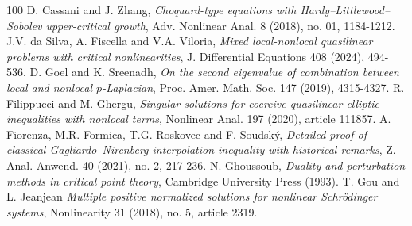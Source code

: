 \documentclass[11pt]{article}
\numberwithin{equation}{section}
\numberwithin{mytheorem}{section}
\begin{document}
\begin{thebibliography}{100}
					 D. Cassani and J. Zhang, {\it Choquard-type equations with Hardy–Littlewood–Sobolev upper-critical growth}, Adv. Nonlinear Anal. 8 (2018), no. 01, 1184-1212.
					 J.V. da Silva, A. Fiscella and V.A. Viloria, {\it Mixed local-nonlocal quasilinear problems with critical nonlinearities}, J. Differential Equations 408 (2024), 494-536.
					D. Goel and K. Sreenadh, {\it On the second eigenvalue of combination between local and nonlocal $p$-Laplacian}, Proc. Amer. Math. Soc. 147 (2019), 4315-4327.
					R. Filippucci and M. Ghergu, {\it Singular solutions for coercive quasilinear elliptic inequalities with nonlocal terms}, Nonlinear Anal. 197 (2020), article 111857.
					 A. Fiorenza, M.R. Formica, T.G. Roskovec and F. Soudský, {\it Detailed proof of classical Gagliardo–Nirenberg interpolation inequality with historical remarks}, Z. Anal. Anwend. 40 (2021), no. 2, 217-236.
					 N. Ghoussoub, {\it Duality and perturbation methods in critical point theory}, Cambridge University Press (1993).
					T. Gou and L. Jeanjean {\it Multiple positive normalized solutions for nonlinear Schrödinger systems}, Nonlinearity 31 (2018), no. 5, article 2319.
					

\end{thebibliography}
\end{document}
